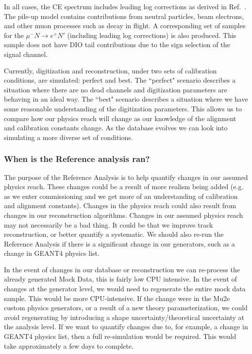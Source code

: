  In all cases, the CE spectrum includes leading log corrections as derived in Ref.~\cite{Szafron:2016}. The pile-up model contains contributions from neutral particles, beam electrons, and other muon processes such as decay in flight. A corresponding set of samples for the $\mu^{-}N \rightarrow e^{+}N'$ (including leading log corrections) is also produced. This sample does not have DIO tail contributions due to the sign selection of the signal channel.

Currently, digitization and reconstruction, under two sets of calibration conditions, are simulated: perfect and best. The ``perfect" scenario describes a situation where there are no dead channels and digitization parameters are behaving in an ideal way. The ``best" scenario describes a situation where we have some reasonable understanding of the digitization parameters. This allows us to compare how our physics reach will change as our knowledge of the alignment and calibration constants change. As the database evolves we can look into simulating a more diverse set of conditions.

\subsubsection{When is the Reference analysis ran?}

The purpose of the Reference Analysis is to help quantify changes in our assumed physics reach. These changes could be a result of more realism being added (e.g. as we enter commissioning and we get more of an understanding of calibration and alignment constants). Changes in the physics reach could also result from changes in our reconstruction algorithms. Changes in our assumed physics reach may not necessarily be a bad thing. It could be that we improve track reconstruction, or better quantify a systematic. We should also re-run the Reference Analysis if there is a significant change in our generators, such as a change in GEANT4 physics list.

In the event of changes in our database or reconstruction we can re-process the already generated Mock Data, this is fairly low CPU intensive. In the event of changes at the generator level, we would need to regenerate the entire mock data sample. This would be more CPU-intensive. If the change were in the Mu2e custom physics generators, or a result of a new theory parameterization, we could avoid regenerating by introducing a shape uncertainty/theoretical uncertainty at the analysis level. If we want to quantify changes due to, for example, a change in GEANT4 physics list, then a full re-simulation would be required. This would take approximately a few days to complete.


